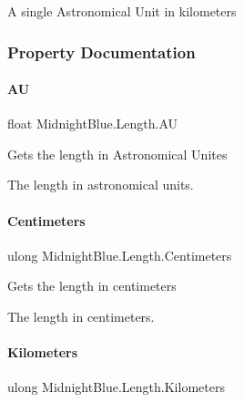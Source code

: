 A single Astronomical Unit in kilometers 



\subsubsection{Property Documentation}
\hypertarget{class_midnight_blue_1_1_length_aa2325bd4894b015715784b027551826f}{}\label{class_midnight_blue_1_1_length_aa2325bd4894b015715784b027551826f} 
\paragraph{\texorpdfstring{AU}{AU}}
{\footnotesize\ttfamily float Midnight\+Blue.\+Length.\+AU\hspace{0.3cm}{\ttfamily [get]}}



Gets the length in Astronomical Unites 

The length in astronomical units.\hypertarget{class_midnight_blue_1_1_length_a935aac3abfc2865e5960a40382227063}{}\label{class_midnight_blue_1_1_length_a935aac3abfc2865e5960a40382227063} 
\paragraph{\texorpdfstring{Centimeters}{Centimeters}}
{\footnotesize\ttfamily ulong Midnight\+Blue.\+Length.\+Centimeters\hspace{0.3cm}{\ttfamily [get]}}



Gets the length in centimeters 

The length in centimeters.\hypertarget{class_midnight_blue_1_1_length_abf0d08eda94640cdb4706f96c3a97a29}{}\label{class_midnight_blue_1_1_length_abf0d08eda94640cdb4706f96c3a97a29} 
\paragraph{\texorpdfstring{Kilometers}{Kilometers}}
{\footnotesize\ttfamily ulong Midnight\+Blue.\+Length.\+Kilometers\hspace{0.3cm}{\ttfamily [get]}}



